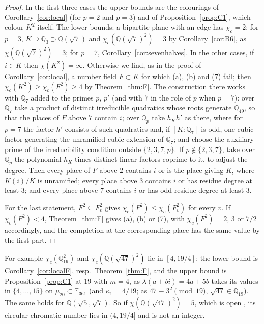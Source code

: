 \documentclass[11pt,a4paper]{amsart}
\theoremstyle{remark}
\newcommand{\Q}{\mathbb{Q}}
\newcommand{\F}{\mathbb{F}}
\begin{document}
\begin{proof}
In the first three cases the upper bounds are the colourings of Corollary~\ref{cor:local} (for $p=2$ and $p=3$) and
of Proposition~\ref{prop:C1}, which colour $K^2$ itself. The lower bounds: a bipartite plane with an edge has
$\chi_c=2$; for $p=3$, $K\supseteq\Q_3\supset\Q(\sqrt7)$ and $\chi_c(\Q(\sqrt7)^2)=3$ by Corollary~\ref{cor:B6}, as
$\chi(\Q(\sqrt7)^2)=3$; for $p=7$, Corollary~\ref{cor:sevenhalves}. In the other cases, if $i\in K$ then
$\chi(K^2)=\infty$. Otherwise we find, as in the proof of Corollary~\ref{cor:local}, a number field $F\subset K$ for
which (a), (b) and (7) fail; then $\chi_c(K^2)\ge\chi_c(F^2)\ge4$ by Theorem~\ref{thm:F}. The construction there
works with $\Q_7$ added to the primes $p$, $p'$ (and with $7$ in the role of $p$ when $p=7$): over $\Q_7$ take a
product of distinct irreducible quadratics whose roots generate $\Q_{49}$, so that the places of $F$ above $7$ contain
$i$; over $\Q_p$ take $h_Kh'$ as there, where for $p=7$ the factor $h'$ consists of such quadratics and, if
$[K:\Q_7]$ is odd, one cubic factor generating the unramified cubic extension of $\Q_7$; and choose the auxiliary
prime of the irreducibility condition outside $\{2,3,7,p\}$. If $p\notin\{2,3,7\}$, take over $\Q_p$ the polynomial
$h_K$ times distinct linear factors coprime to it, to adjust the degree. Then every place of $F$ above $2$ contains $i$ or is the
place giving $K$, where $K(i)/K$ is unramified; every place above $3$ contains $i$ or has residue degree at least $3$;
and every place above $7$ contains $i$ or has odd residue degree at least $3$.

For the last statement, $F^2\subseteq F_v^2$ gives $\chi_c(F^2)\le\chi_c(F_v^2)$ for every $v$. If $\chi_c(F^2)<4$,
Theorem~\ref{thm:F} gives (a), (b) or (7), with $\chi_c(F^2)=2$, $3$ or $7/2$ accordingly, and the completion at the
corresponding place has the same value by the first part.
\end{proof}

For example $\chi_c(\Q_{19}^2)$ and $\chi_c(\Q(\sqrt{47})^2)$ lie in $[4,19/4]$: the lower bound is
Corollary~\ref{cor:localF}, resp.\ Theorem~\ref{thm:F}, and the upper bound is Proposition~\ref{prop:C1} at $19$
with $m=4$, as $\lambda(a+bi)=4a+5b$ takes its values in $\{4,\dots,15\}$ on $\mu_{20}\subset\F_{361}$ (and
$\kappa_1=4/19$; as $47\equiv3^2\pmod{19}$, $\sqrt{47}\in\Q_{19}$). The same holds for $\Q(\sqrt5,\sqrt7)$. So if
$\chi(\Q(\sqrt{47})^2)=5$, which is open \cite[Corollary~2]{FC}, its circular chromatic number lies in $(4,19/4]$ and is not
an integer.
\end{document}
